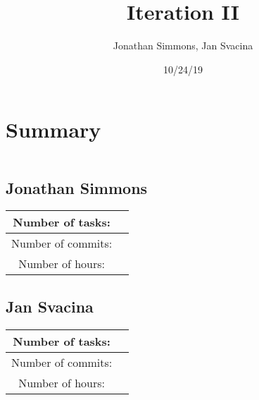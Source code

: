 \documentclass{article}
\title{Iteration II}
\date{10/24/19}
\author{Jonathan Simmons, Jan Svacina}
\begin{document}
    \maketitle


    

    \section*{Summary}
    \inputminted{python}{snippets/imports.py}

    \subsection*{Jonathan Simmons}

    \begin{center}
        \begin{tabular}{||c c ||}
            \hline
            Number of tasks: &  \\
            \hline
            Number of commits: &  \\
            \hline
            Number of hours: &  \\
            \hline
        \end{tabular}
    \end{center}

    \subsection*{Jan Svacina}

    \begin{center}
        \begin{tabular}{||c c ||}
            \hline
            Number of tasks: &  \\
            \hline
            Number of commits: &  \\
            \hline
            Number of hours: &  \\
            \hline
        \end{tabular}
    \end{center}
\end{document}
